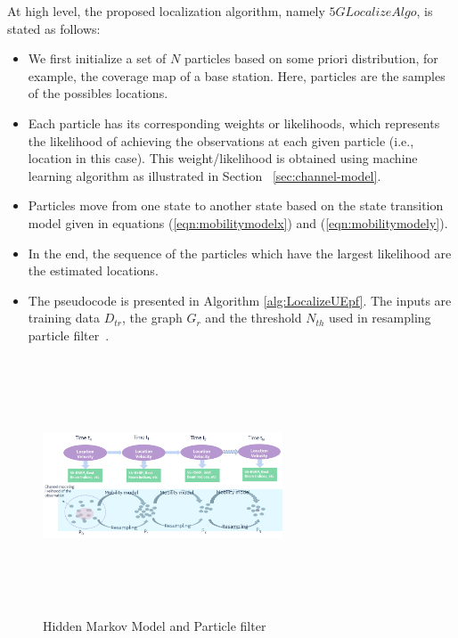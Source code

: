 \documentclass[conference, 10pt]{IEEEtran}
\begin{document}
At high level, the proposed localization algorithm, namely $5GLocalizeAlgo$, is stated as follows:
\begin{itemize}
	\item We first initialize a set of $N$ particles based on some priori distribution, for example, the coverage map of a base station.
	Here, particles are the samples of the possibles locations. 
	\item Each particle has its corresponding weights or likelihoods, which represents the likelihood of achieving the observations at each given particle (i.e., location in this case). This weight/likelihood is obtained using machine learning algorithm as illustrated in Section ~\ref{sec:channel-model}.
	\item Particles move from one state to another state based 
	on the state transition model given in equations (\ref{eqn:mobilitymodelx}) and (\ref{eqn:mobilitymodely}).
	\item In the end, the sequence of the particles which have the largest likelihood are the estimated locations. 
	\item The pseudocode is presented in Algorithm \ref{alg:LocalizeUEpf}. The inputs are training data $D_{tr}$, the graph $G_r$ and the threshold $N_{th}$ used in resampling particle filter~\cite{ThrunParticleFilter}.
\end{itemize}

\begin{figure}[t]
	\begin{center}
	\includegraphics[height=3in,width=2.8in]{./HMM_ParticleFilter_Illustration.png}
	\caption{\label{fig:hmm_particle}
	{\small Hidden Markov Model and Particle filter}}
	\end{center}
	\end{figure}
\end{document}
